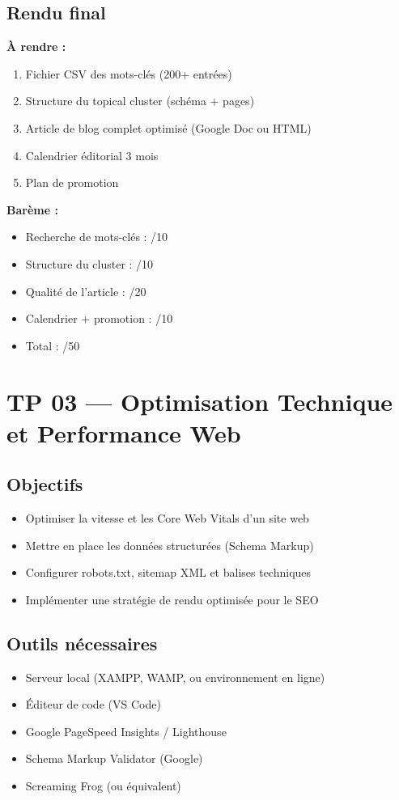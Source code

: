 \documentclass[12pt,a4paper]{report}
\begin{document}
\section{Rendu final}

\textbf{À rendre :}
\begin{enumerate}
\item Fichier CSV des mots-clés (200+ entrées)
\item Structure du topical cluster (schéma + pages)
\item Article de blog complet optimisé (Google Doc ou HTML)
\item Calendrier éditorial 3 mois
\item Plan de promotion
\end{enumerate}

\textbf{Barème :}
\begin{itemize}
\item Recherche de mots-clés : /10
\item Structure du cluster : /10
\item Qualité de l'article : /20
\item Calendrier + promotion : /10
\item Total : /50
\end{itemize}

\chapter{TP 03 --- Optimisation Technique et Performance Web}

\section{Objectifs}
\begin{itemize}
\item Optimiser la vitesse et les Core Web Vitals d'un site web
\item Mettre en place les données structurées (Schema Markup)
\item Configurer robots.txt, sitemap XML et balises techniques
\item Implémenter une stratégie de rendu optimisée pour le SEO
\end{itemize}

\section{Outils nécessaires}
\begin{itemize}
\item Serveur local (XAMPP, WAMP, ou environnement en ligne)
\item Éditeur de code (VS Code)
\item Google PageSpeed Insights / Lighthouse
\item Schema Markup Validator (Google)
\item Screaming Frog (ou équivalent)
\end{itemize}
\end{document}

